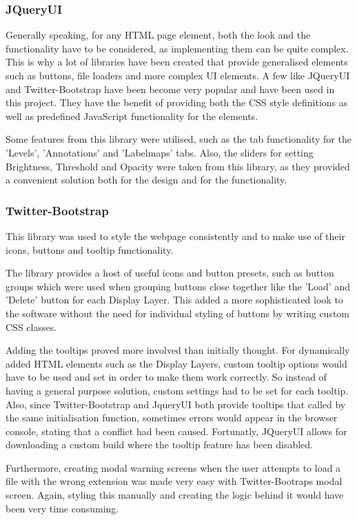 \documentclass[a4paper,11pt,titlepage]{article}
\begin{document}
\subsubsection{JQueryUI}

Generally speaking, for any HTML page element, both the look and the functionality have to be considered, as implementing them can be quite complex. This is why a lot of libraries have been created that provide generalised elements such as buttons, file loaders and more complex UI elements. A few like JQueryUI and Twitter-Bootstrap have been become very popular and have been used in this project. They have the benefit of providing both the CSS style definitions as well as predefined JavaScript functionality for the elements. 

Some features from this library were utilised, such as the tab functionality for the 'Levels', 'Annotations' and 'Labelmaps' tabs. Also, the sliders for setting Brightness, Threshold and Opacity were taken from this library, as they provided a convenient solution both for the design and for the functionality.


\subsubsection{Twitter-Bootstrap}

This library was used to style the webpage consistently and to make use of their icons, buttons and tooltip functionality.

The library provides a host of useful icons and button presets, such as button groups which were used when grouping buttons close together like the 'Load' and 'Delete' button for each Display Layer. This added a more sophisticated look to the software without the need for individual styling of buttons by writing custom CSS classes.

Adding the tooltips proved more involved than initially thought. For dynamically added HTML elements such as the Display Layers, custom tooltip options would have to be used and set in order to make them work correctly. So instead of having a general purpose solution, custom settings had to be set for each tooltip. Also, since Twitter-Bootstrap and JqueryUI both provide tooltips that called by the same initialisation function, sometimes errors would appear in the browser console, stating that a conflict had been caused. Fortunatly, JQueryUI allows for downloading a custom build where the tooltip feature has been disabled.

Furthermore, creating modal warning screens when the user attempts to load a file with the wrong extension was made very easy with Twitter-Bootraps modal screen. Again, styling this manually and creating the logic behind it would have been very time consuming.
\end{document}
